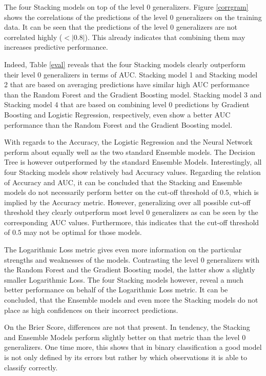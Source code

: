 \documentclass[12pt]{article}
\begin{document}
The four Stacking models on top of the level 0 generalizers. Figure \ref{corrgram} shows the correlations of the predictions of the level 0 generalizers on the training data. It can be seen that the predictions of the level 0 generalizers are not correlated highly ($<|0.8|$). This already indicates that combining them may increases predictive performance.

Indeed, Table \ref{eval} reveals that the four Stacking models clearly outperform their level 0 generalizers in terms of AUC. Stacking model 1 and Stacking model 2 that are based on averaging predictions have similar high AUC performance than the Random Forest and the Gradient Boosting model. Stacking model 3 and Stacking model 4 that are based on combining level 0 predictions by Gradient Boosting and Logistic Regression, respectively, even show a better AUC performance than the Random Forest and the Gradient Boosting model. 

With regards to the Accuracy, the Logistic Regression and the Neural Network perform about equally well as the two standard Ensemble models. The Decision Tree is however outperformed by the standard Ensemble Models. Interestingly, all four Stacking models show relatively bad Accuracy values. Regarding the relation of Accuracy and AUC, it can be concluded that the Stacking and Ensemble models do not necessarily perform better on the cut-off threshold of $0.5$, which is implied by the Accuracy metric. However, generalizing over all possible cut-off threshold they clearly outperform most level 0 generalizers as can be seen by the corresponding AUC values. Furthermore, this indicates that the cut-off threshold of $0.5$ may not be optimal for those models.

The Logarithmic Loss metric gives even more information on the particular strengths and weaknesses of the models. Contrasting the level 0 generalizers with the Random Forest and the Gradient Boosting model, the latter show a slightly smaller Logarithmic Loss. The four Stacking models however, reveal a much better performance on behalf of the Logarithmic Loss metric. It can be concluded, that the Ensemble models and even more the Stacking models do not place as high confidences on their incorrect predictions. 

On the Brier Score, differences are not that present. In tendency, the Stacking and Ensemble Models perform slightly better on that metric than the level 0 generalizers. One time more, this shows that in binary classification a good model is not only defined by its errors but rather by which observations it is able to classify correctly.
\end{document}

